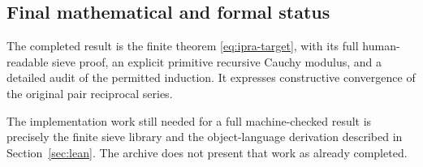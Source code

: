 \subsection{Final mathematical and formal status}

The completed result is the finite theorem
\eqref{eq:ipra-target}, with its full human-readable sieve proof,
an explicit primitive recursive Cauchy modulus, and a detailed audit of
the permitted induction. It expresses constructive convergence of the
original pair reciprocal series.

The implementation work still needed for a full machine-checked result is
precisely the finite sieve library and the object-language derivation
described in Section~\ref{sec:lean}. The archive does not present that
work as already completed.
